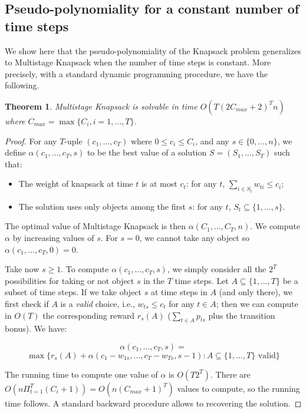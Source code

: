 \documentclass[a4paper]{book}
\newtheorem{theorem}{Theorem}[chapter]
\newtheorem{proof}{\noindent{\bf Proof.} }
\begin{document}
\subsection{Pseudo-polynomiality for a constant number of time steps}\label{sec:pseudo}

We show here that the pseudo-polynomiality of the {\sc Knapsack} problem generalizes to {\sc Multistage  Knapsack} when the number of time steps is constant. More precisely, with a standard dynamic programming procedure, we have the following.

\begin{theorem}\label{thpseudo}
{\sc Multistage  Knapsack} is solvable in time $O(T(2C_{max}+2)^Tn)$ where $C_{max}=\max\{C_i,i=1,\dots,T\}$.
\end{theorem}


\begin{proof}

For any $T$-uple $(c_1,\dots,c_T)$ where $0\leq c_i\leq C_i$, and any $s\in \{0,\dots,n\}$, we define $\alpha(c_1,\dots,c_T,s)$ to be the best value of a solution $S=(S_1,\dots,S_T)$ such that:
\begin{itemize}
	\item The weight of knapsack at time $t$ is at most $c_t$: for any $t$, $\sum_{i\in S_t}w_{ti}\leq c_i$;
	\item The solution uses only objects among the first $s$: for any $t$, $S_t\subseteq \{1,\dots,s\}$.
\end{itemize}
The  optimal value of {\sc Multistage  Knapsack} is then $\alpha(C_1,\dots,C_T,n)$. We compute $\alpha$ by increasing values of $s$. For $s=0$, we cannot take any object so $\alpha(c_1,\dots,c_T,0)=0$. 

Take now $s\geq 1$. To compute $\alpha(c_1,\dots,c_T,s)$, we simply consider all the $2^T$ possibilities for taking or not object $s$ in the $T$ time steps. Let $A\subseteq \{1,\dots,T\}$ be a subset of time steps. If we take object $s$ at time steps in $A$ (and only there), we first check if $A$ is a {\it valid} choice, i.e., $w_{ts}\leq c_t$ for any $t\in A$; then we can compute in $O(T)$ the corresponding reward $r_s(A)$ ($\sum_{t\in A}p_{ts}$ plus the transition bonus). We have:

$$\alpha(c_1,\dots,c_T,s)=$$
$$\max\{r_s(A)+\alpha(c_1-w_{1s},\dots,c_T-w_{Ts},s-1):A\subseteq\{1,\dots,T\} \mbox{ valid}\}$$

The running time to compute one value of $\alpha$ is $O(T2^T)$. There are $O(n\Pi_{t=1}^T(C_i+1))=O(n(C_{max}+1)^T)$ values to compute, so the running time follows. A standard backward procedure allows to recovering the solution.
\end{proof}
\end{document}
